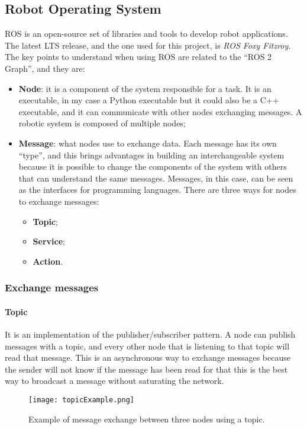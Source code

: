 \documentclass[../thesis.tex]{subfiles}
\begin{document}
\subsection{Robot Operating System}
\acrfull{ROS} is an open-source set of libraries and tools to develop robot applications. The latest \acrshort{LTS} release, and the one used for this project, is \textit{ROS Foxy Fitzroy}. The key points to understand when using \acrshort{ROS} are related to the ``ROS 2 Graph'', and they are:
\begin{itemize}
    \item \textbf{Node}: it is a component of the system responsible for a task. It is an executable, in my case a Python executable but it could also be a C++ executable, and it can communicate with other nodes exchanging messages. A robotic system is composed of multiple nodes;
    \item \textbf{Message}: what nodes use to exchange data. Each message has its own ``type'', and this brings advantages in building an interchangeable system because it is possible to change the components of the system with others that can understand the same messages. Messages, in this case, can be seen as the interfaces for programming languages. There are three ways for nodes to exchange messages:
        \begin{itemize}
            \item \textbf{Topic};
            \item \textbf{Service};
            \item \textbf{Action}.
        \end{itemize}
\end{itemize}
\subsubsection{Exchange messages}
\paragraph{Topic}
It is an implementation of the publisher/subscriber pattern. A node can publish messages with a topic, and every other node that is listening to that topic will read that message. This is an asynchronous way to exchange messages because the sender will not know if the message has been read for that this is the best way to broadcast a message without saturating the network.
\begin{figure}[H]
    \centering
    \texttt{[image: topicExample.png]}
    \caption{Example of message exchange between three nodes using a topic.}
    \label{fig:exampleTopicExchangeMessage}
\end{figure}
\end{document}
